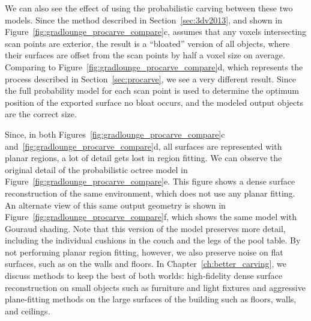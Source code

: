 \documentclass[12pt,onecolumn,oneside]{book}
\begin{document}
We can also see the effect of using the probabilistic carving between these two models.  Since the method described in Section~\ref{sec:3dv2013}, and shown in Figure~\ref{fig:gradlounge_procarve_compare}c, assumes that any voxels intersecting scan points are exterior, the result is a ``bloated'' version of all objects, where their surfaces are offset from the scan points by half a voxel size on average.  Comparing to Figure~\ref{fig:gradlounge_procarve_compare}d, which represents the process described in Section~\ref{sec:procarve}, we see a very different result.  Since the full probability model for each scan point is used to determine the optimum position of the exported surface no bloat occurs, and the modeled output objects are the correct size.

Since, in both Figures~\ref{fig:gradlounge_procarve_compare}c and~\ref{fig:gradlounge_procarve_compare}d, all surfaces are represented with planar regions, a lot of detail gets lost in region fitting.  We can observe the original detail of the probabilistic octree model in Figure~\ref{fig:gradlounge_procarve_compare}e.  This figure shows a dense surface reconstruction of the same environment, which does not use any planar fitting.  An alternate view of this same output geometry is shown in Figure~\ref{fig:gradlounge_procarve_compare}f, which shows the same model with Gouraud shading.  Note that this version of the model preserves more detail, including the individual cushions in the couch and the legs of the pool table.  By not performing planar region fitting, however, we also preserve noise on flat surfaces, such as on the walls and floors.  In Chapter~\ref{ch:better_carving}, we discuss methods to keep the best of both worlds:  high-fidelity dense surface reconstruction on small objects such as furniture and light fixtures and aggressive plane-fitting methods on the large surfaces of the building such as floors, walls, and ceilings.
\end{document}
